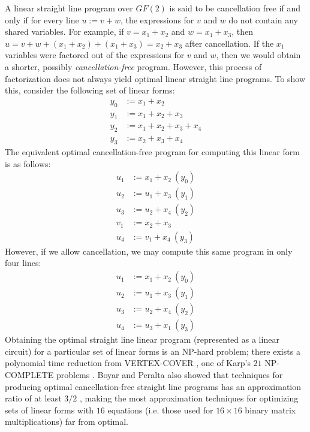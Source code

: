 A linear straight line program over $GF(2)$ is said to be cancellation free if and only if for every line $u := v + w$, the expressions for $v$ and $w$ do not contain any shared variables. For example, if $v = x_1 + x_2$ and $w = x_1 + x_3$, then $u = v + w + (x_1 + x_2) + (x_1 + x_3) = x_2 + x_3$ after cancellation. If the $x_1$ variables were factored out of the expressions for $v$ and $w$, then we would obtain a shorter, possibly \emph{cancellation-free} program. However, this process of factorization does not always yield optimal linear straight line programs. To show this, consider the following set of linear forms:
\begin{align*}
y_0 & := x_1 + x_2 \\
y_1 & := x_1 + x_2 + x_3 \\
y_2 & := x_1 + x_2 + x_3 + x_4 \\
y_3 & := x_2 + x_3 + x_4 
\end{align*}
The equivalent optimal cancellation-free program for computing this linear form is as follows:
\begin{align*}
u_1 & := x_1 + x_2 \: (y_0)\\
u_2 & := u_1 + x_3 \: (y_1)\\
u_3 & := u_2 + x_4 \: (y_2)\\
v_1 & := x_2 + x_3 \\
u_4 & := v_1 + x_4 \: (y_3)
\end{align*}
However, if we allow cancellation, we may compute this same program in only four lines:
\begin{align*}
u_1 & := x_1 + x_2 \: (y_0)\\
u_2 & := u_1 + x_3 \: (y_1)\\
u_3 & := u_2 + x_4 \: (y_2)\\
u_4 & := u_3 + x_1 \: (y_3)
\end{align*}
Obtaining the optimal straight line linear program (represented as a linear circuit) for a particular set of linear forms is an NP-hard problem; there exists a polynomial time reduction from VERTEX-COVER \cite{Boyar08-1}, one of Karp's $21$ NP-COMPLETE problems \cite{Karp72-1}. Boyar and Peralta also showed that techniques for producing optimal cancellation-free straight line programs has an approximation ratio of at least $3/2$ \cite{Boyar08-1}, making the most approximation techniques for optimizing sets of linear forms with $16$ equations (i.e. those used for $16 \times 16$ binary matrix multiplications) far from optimal. 

